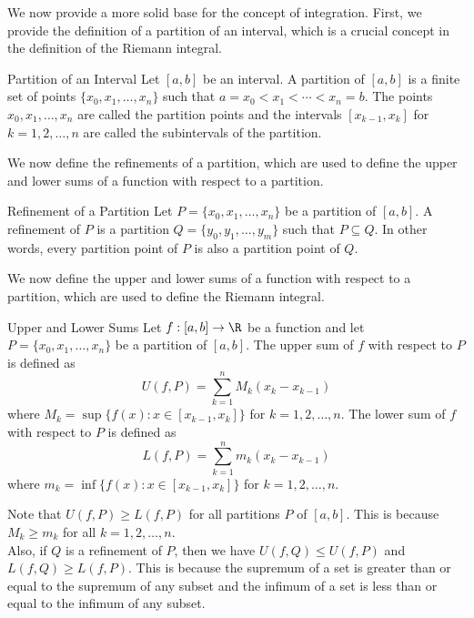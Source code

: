 \documentclass[openany]{book}
\begin{document}
We now provide a more solid base for the concept of integration. First, we provide the definition of a partition of an interval, which is a crucial concept in the definition of the Riemann integral.
\begin{mydefinition}{Partition of an Interval}
    Let $[a, b]$ be an interval. A partition of $[a, b]$ is a finite set of points $\{x_0, x_1, \ldots, x_n\}$ such that $a = x_0 < x_1 < \cdots < x_n = b$. The points $x_0, x_1, \ldots, x_n$ are called the partition points and the intervals $[x_{k-1}, x_k]$ for $k = 1, 2, \ldots, n$ are called the subintervals of the partition.
\end{mydefinition}
We now define the refinements of a partition, which are used to define the upper and lower sums of a function with respect to a partition.
\begin{mydefinition}{Refinement of a Partition}
    Let $P = \{x_0, x_1, \ldots, x_n\}$ be a partition of $[a, b]$. A refinement of $P$ is a partition $Q = \{y_0, y_1, \ldots, y_m\}$ such that $P \subseteq Q$. In other words, every partition point of $P$ is also a partition point of $Q$.
\end{mydefinition}
We now define the upper and lower sums of a function with respect to a partition, which are used to define the Riemann integral.
\begin{mydefinition}{Upper and Lower Sums}
    Let $f: [a, b] \to \R$ be a function and let $P = \{x_0, x_1, \ldots, x_n\}$ be a partition of $[a, b]$. The upper sum of $f$ with respect to $P$ is defined as
    \[
        U(f, P) = \sum_{k=1}^n M_k (x_k - x_{k-1})
    \]
    where $M_k = \sup\{f(x) : x \in [x_{k-1}, x_k]\}$ for $k = 1, 2, \ldots, n$. The lower sum of $f$ with respect to $P$ is defined as
    \[
        L(f, P) = \sum_{k=1}^n m_k (x_k - x_{k-1})
    \]
    where $m_k = \inf\{f(x) : x \in [x_{k-1}, x_k]\}$ for $k = 1, 2, \ldots, n$.
\end{mydefinition}
\begin{mynote}
    Note that $U(f, P) \geq L(f, P)$ for all partitions $P$ of $[a, b]$. This is because $M_k \geq m_k$ for all $k = 1, 2, \ldots, n$. \\
    Also, if $Q$ is a refinement of $P$, then we have $U(f, Q) \leq U(f, P)$ and $L(f, Q) \geq L(f, P)$. This is because the supremum of a set is greater than or equal to the supremum of any subset and the infimum of a set is less than or equal to the infimum of any subset.
\end{mynote}
\end{document}
